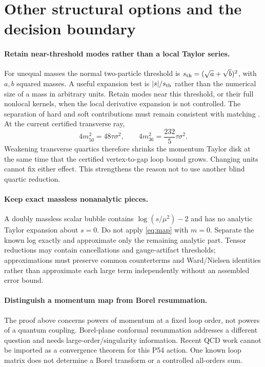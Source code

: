 \documentclass[11pt]{article}
\begin{document}
\section{Other structural options and the decision boundary}
\paragraph{Retain near-threshold modes rather than a local Taylor series.}
For unequal masses the normal two-particle threshold is
$s_{\rm th}=(\sqrt a+\sqrt b)^2$, with $a,b$ squared masses.
A useful expansion test is $|s|/s_{\rm th}$ rather than the numerical
size of a mass in arbitrary units. Retain modes near this threshold, or
their full nonlocal kernels, when the local derivative expansion is
not controlled. The separation of hard and soft contributions must
remain consistent with matching \cite{Dittmaier}.
At the current certified transverse ray,
\begin{equation}
 4m_{50}^2=48\tau\sigma^2,\qquad
 4m_{36}^2=\frac{232}{5}\tau\sigma^2.
\end{equation}
Weakening transverse quartics therefore shrinks the momentum Taylor disk
at the same time that the certified vertex-to-gap loop bound grows.
Changing units cannot fix either effect. This strengthens the reason
not to use another blind quartic reduction.

\paragraph{Keep exact massless nonanalytic pieces.}
A doubly massless scalar bubble contains $\log(s/\mu^2)-2$ and has no
analytic Taylor expansion about $s=0$. Do not apply \eqref{eq:map}
with $m=0$. Separate the known log exactly and approximate only the
remaining analytic part. Tensor reductions may contain cancellations
and gauge-artifact thresholds; approximations must preserve common
counterterms and Ward/Nielsen identities rather than approximate each
large term independently without an assembled error bound.

\paragraph{Distinguish a momentum map from Borel resummation.}
The proof above concerns powers of momentum at a fixed loop order,
not powers of a quantum coupling. Borel-plane conformal resummation
addresses a different question and needs large-order/singularity
information. Recent QCD work \cite{Caprini} cannot be imported as a
convergence theorem for this P54 action. One known loop matrix does not
determine a Borel transform or a controlled all-orders sum.
\end{document}

